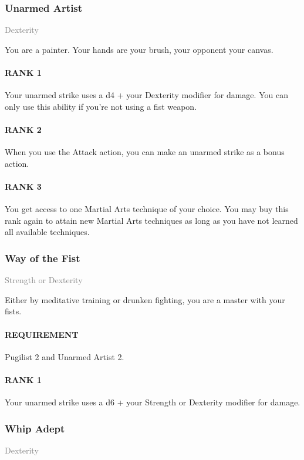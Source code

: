 \subsubsection{Unarmed Artist} \label{feat::unarmedartist}
\small{\textcolor{gray}{Dexterity}}

\normalsize
You are a painter.
Your hands are your brush, your opponent your canvas.
\paragraph{RANK 1} Your unarmed strike uses a d4 + your Dexterity modifier for damage.
You can only use this ability if you're not using a fist weapon.
\paragraph{RANK 2} When you use the Attack action, you can make an unarmed strike as a bonus action.
\paragraph{RANK 3} You get access to one Martial Arts technique of your choice.
You may buy this rank again to attain new Martial Arts techniques as long as you have not learned all available techniques.

\subsubsection{Way of the Fist} \label{feat::wayofthefist}
\small{\textcolor{gray}{Strength or Dexterity}}

\normalsize
Either by meditative training or drunken fighting, you are a master with your fists.
\paragraph{REQUIREMENT} Pugilist 2 and Unarmed Artist 2.
\paragraph{RANK 1} Your unarmed strike uses a d6 + your Strength or Dexterity modifier for damage.

\subsubsection{Whip Adept} \label{feat::whipadept}
\small{\textcolor{gray}{Dexterity}}

